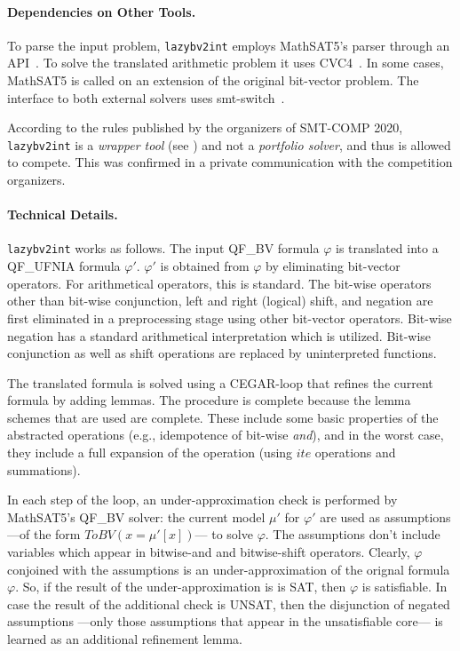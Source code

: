 \documentclass{easychair}
\newcommand{\lazybvtoint}{\texttt{lazybv2int}\xspace}
\newcommand{\smtcomp}{SMT-COMP\xspace}
\newcommand{\qfbv}{QF\_BV\xspace}
\newcommand{\qfufnia}{QF\_UFNIA\xspace}
\newcommand{\msat}{MathSAT5\xspace}
\newcommand{\cvcfour}{CVC4\xspace}
\newcommand{\smtswitch}{smt-switch\xspace}
\begin{document}
\paragraph{Dependencies on Other Tools.}
%
To parse the input problem, \lazybvtoint employs \msat's
parser through an API~\cite{mathsat5}.
To solve the translated arithmetic problem it uses \cvcfour~\cite{cvc4}.
In some cases, \msat is called on an extension of the original bit-vector problem.
%
The interface to both external solvers uses
\smtswitch~\cite{smtswitchgithub}.

According to the rules published by the organizers
of \smtcomp 2020, \lazybvtoint is a {\em wrapper tool} (see \cite{rules20})
and not a {\em portfolio solver},
and thus is allowed to compete.
This was confirmed in a private communication with the competition organizers.

\paragraph{Technical Details.}
\lazybvtoint works as follows. The input \qfbv formula $\varphi$ is translated
into a \qfufnia formula $\varphi'$. $\varphi'$ is obtained from $\varphi$ by
eliminating bit-vector operators. For arithmetical operators, this is standard.
The bit-wise operators other than bit-wise conjunction, left and right (logical)
shift, and negation are first eliminated in a preprocessing stage using other
bit-vector operators. Bit-wise negation has a standard arithmetical
interpretation which is utilized. Bit-wise conjunction as well as shift
operations are replaced by uninterpreted functions.

The translated formula is solved using a CEGAR-loop that refines the current
formula by adding lemmas. The procedure is complete because the lemma schemes
that are used are complete.
%
These include some basic properties of the abstracted operations (e.g.,
idempotence of bit-wise \emph{and}), and in the worst case, they include a full
expansion of the operation (using $ite$ operations and summations).

In each step of the loop, an under-approximation check is performed by \msat's
\qfbv solver: the current model $\mu'$ for $\varphi'$ are used as assumptions
---of the form $ToBV(x = \mu'[x])$--- to solve $\varphi$. The assumptions don't
include variables which appear in bitwise-and and bitwise-shift operators.
Clearly, $\varphi$ conjoined with the assumptions is an under-approximation of
the orignal formula $\varphi$. So, if the result of the under-approximation is
is SAT, then $\varphi$ is satisfiable. In case the result of the additional
check is UNSAT, then the disjunction of negated assumptions ---only those
assumptions that appear in the unsatisfiable core--- is learned as an additional
refinement lemma.
\end{document}
